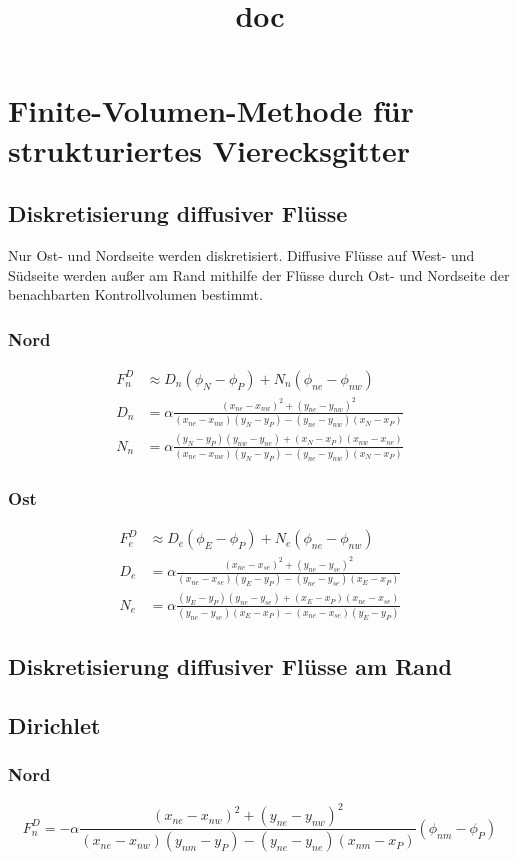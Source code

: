 \documentclass[10pt,a4paper]{article}
\title{doc}
\begin{document}
\section{Finite-Volumen-Methode für strukturiertes Vierecksgitter}
\subsection{Diskretisierung diffusiver Flüsse}
Nur Ost- und Nordseite werden diskretisiert. Diffusive Flüsse auf West- und Südseite werden außer am Rand mithilfe der Flüsse durch Ost- und Nordseite der benachbarten Kontrollvolumen bestimmt.
\subsubsection{Nord}
\begin{align}
F_n^D &\approx D_n ( \phi_N-\phi_P )+N_n(\phi_{ne} - \phi_{nw}) \\
D_n &= \alpha \frac{(x_{ne}-x_{nw})^2 +(y_{ne}-y_{nw})^2}{(x_{ne}-x_{nw})(y_N-y_P)-(y_{ne}-y_{nw})(x_N-x_P)} \\
N_n &= \alpha \frac{(y_N-y_P)(y_{nw}-y_{ne})+(x_N-x_P)(x_{nw}-x_{ne})}{(x_{ne}-x_{nw})(y_N-y_P)-(y_{ne}-y_{nw})(x_N-x_P)}
\end{align}
\subsubsection{Ost}
\begin{align}
F_e^D &\approx D_e ( \phi_E-\phi_P )+N_e(\phi_{ne} - \phi_{nw}) \\
D_e &= \alpha \frac{(x_{ne}-x_{se})^2 +(y_{ne}-y_{se})^2}{(x_{ne}-x_{se})(y_E-y_P)-(y_{ne}-y_{se})(x_E-x_P)} \\
N_e &= \alpha \frac{(y_E-y_P)(y_{ne}-y_{se})+(x_E-x_P)(x_{ne}-x_{se})}{(y_{ne}-y_{se})(x_E-x_P)-(x_{ne}-x_{se})(y_E-y_P)}
\end{align}
\subsection{Diskretisierung diffusiver Flüsse am Rand}
\subsection{Dirichlet}
\subsubsection{Nord}
\begin{equation}
F_n^D = -\alpha \frac{(x_{ne}-x_{nw})^2+(y_{ne}-y_{nw})^2}{(x_{ne}-x_{nw})(y_{nm}-y_P)-(y_{ne}-y_{ne})(x_{nm}-x_P)}(\phi_{nm}-\phi_P)
\end{equation}
\end{document}
